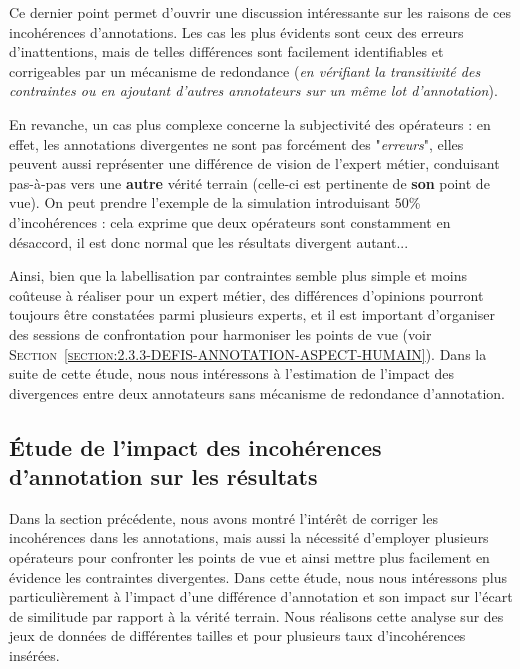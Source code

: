 			\begin{leftBarAuthorOpinion}
				Ce dernier point permet d'ouvrir une discussion intéressante sur les raisons de ces incohérences d'annotations.
				Les cas les plus évidents sont ceux des erreurs d’inattentions, mais de telles différences sont facilement identifiables et corrigeables par un mécanisme de redondance (\textit{en vérifiant la transitivité des contraintes ou en ajoutant d'autres annotateurs sur un même lot d'annotation}).
				
				En revanche, un cas plus complexe concerne la subjectivité des opérateurs :
				en effet, les annotations divergentes ne sont pas forcément des "\textit{erreurs}", elles peuvent aussi représenter une différence de vision de l'expert métier, conduisant pas-à-pas vers une \textbf{autre} vérité terrain (celle-ci est pertinente de \textbf{son} point de vue).
				On peut prendre l'exemple de la simulation introduisant $50$\% d'incohérences : cela exprime que deux opérateurs sont constamment en désaccord, il est donc normal que les résultats divergent autant...
				
				Ainsi, bien que la labellisation par contraintes semble plus simple et moins coûteuse à réaliser pour un expert métier, des différences d'opinions pourront toujours être constatées parmi plusieurs experts, et il est important d'organiser des sessions de confrontation pour harmoniser les points de vue (voir \textsc{Section~\ref{section:2.3.3-DEFIS-ANNOTATION-ASPECT-HUMAIN}}).
				Dans la suite de cette étude, nous nous intéressons à l'estimation de l'impact des divergences entre deux annotateurs sans mécanisme de redondance d'annotation.
			\end{leftBarAuthorOpinion}
	
	
	\subsection{Étude de l'impact des incohérences d'annotation sur les résultats}
	\label{section:4.6.2-ETUDE-ROBUSTESSE-SIMULATION-IMPACT-DIFFERENCES}
		
		Dans la section précédente, nous avons montré l'intérêt de corriger les incohérences dans les annotations, mais aussi la nécessité d'employer plusieurs opérateurs pour confronter les points de vue et ainsi mettre plus facilement en évidence les contraintes divergentes.
		Dans cette étude, nous nous intéressons plus particulièrement à l'impact d'une différence d'annotation et son impact sur l'écart de similitude par rapport à la vérité terrain.
		Nous réalisons cette analyse sur des jeux de données de différentes tailles et pour plusieurs taux d'incohérences insérées.
		
